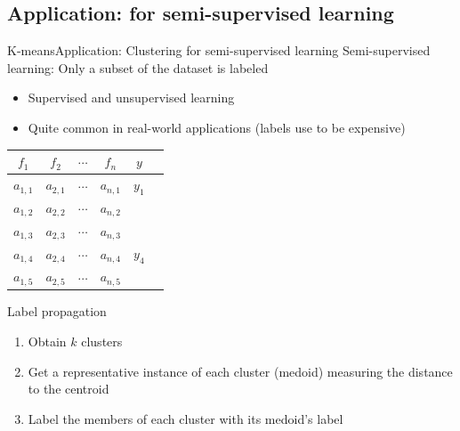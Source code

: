 \documentclass[10pt,compress]{beamer} %
\begin{document}
\subsection{Application: for semi-supervised learning}
\begin{frame}[plain]{K-means}{Application: Clustering for semi-supervised learning}
    Semi-supervised learning: Only a subset of the dataset is labeled
    \begin{itemize}
       \item Supervised and unsupervised learning
       \item Quite common in real-world applications (labels use to be expensive)
    \end{itemize} 

	\begin{center}
	\begin{tabular}{cccccc}\hline
	 	$f_1$     & $f_2$     & $\cdots$ & $f_n$     & $y$\\\hline
	 	$a_{1,1}$ & $a_{2,1}$ & $\cdots$ & $a_{n,1}$ & $y_1$ \\
	 	$a_{1,2}$ & $a_{2,2}$ & $\cdots$ & $a_{n,2}$ &  \\
	 	$a_{1,3}$ & $a_{2,3}$ & $\cdots$ & $a_{n,3}$ &  \\
	 	$a_{1,4}$ & $a_{2,4}$ & $\cdots$ & $a_{n,4}$ & $y_4$ \\
	 	$a_{1,5}$ & $a_{2,5}$ & $\cdots$ & $a_{n,5}$ &  \\
	 	\hline
	\end{tabular}
	\end{center}

    \begin{block}{Label propagation}
    \begin{enumerate}
       \item Obtain $k$ clusters
       \item Get a representative instance of each cluster (\alert{medoid}) measuring the distance to the centroid
       \item Label the members of each cluster with its medoid's label
    \end{enumerate} 
    \end{block}
\end{frame}
\end{document}
